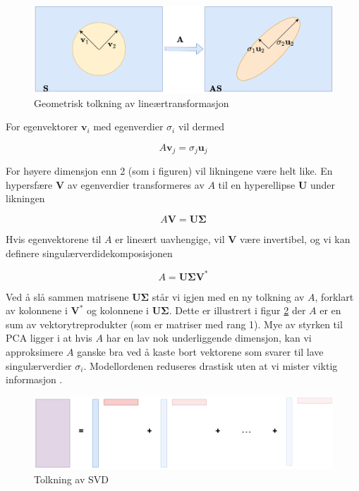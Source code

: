 \begin{figure}[h]
	\centering
	\includegraphics[width=\textwidth]{figurer/pca_skvis}
	\caption{Geometrisk tolkning av lineærtransformasjon}
	\label{fig:pca_skvis}
\end{figure}

For egenvektorer $\mathbf{v}_i$ med egenverdier $\sigma_i$ vil dermed

\begin{equation}
	A \mathbf{v}_j = \sigma_j \mathbf{u}_j
\end{equation}

For høyere dimensjon enn 2 (som i figuren) vil likningene være helt like. En hypersfære $\mathbf{V}$ av egenverdier transformeres av $A$ til en hyperellipse $\mathbf{U}$ under likningen

\begin{equation}
	A \mathbf{V} =\mathbf{U} \mathbf{\Sigma}
\end{equation}

Hvis egenvektorene til $A$ er lineært uavhengige, vil $\mathbf{V}$ være invertibel, og vi kan definere singulærverdidekomposisjonen

\begin{equation}
	A  =\mathbf{U} \mathbf{\Sigma} \mathbf{V}^*
\end{equation}

Ved å slå sammen matrisene $\mathbf{U} \mathbf{\Sigma}$ står vi igjen med en ny tolkning av $A$, forklart av kolonnene i $\mathbf{V}^*$ og kolonnene i $\mathbf{U} \mathbf{\Sigma}$. Dette er illustrert i figur \ref{fig:pca_komponentvis} der $A$ er en sum av vektorytreprodukter (som er matriser med rang 1). Mye av styrken til PCA ligger i at hvis $A$ har en lav nok underliggende dimensjon, kan vi approksimere $A$ ganske bra ved å kaste bort vektorene som svarer til lave singulærverdier $\sigma_i$. Modellordenen reduseres drastisk uten at vi mister viktig informasjon \Cooley.

\begin{figure}[h]
	\centering
	\includegraphics[width=\textwidth]{figurer/pca_komponentvis}
	\caption{Tolkning av SVD}
	\label{fig:pca_komponentvis}
\end{figure}

